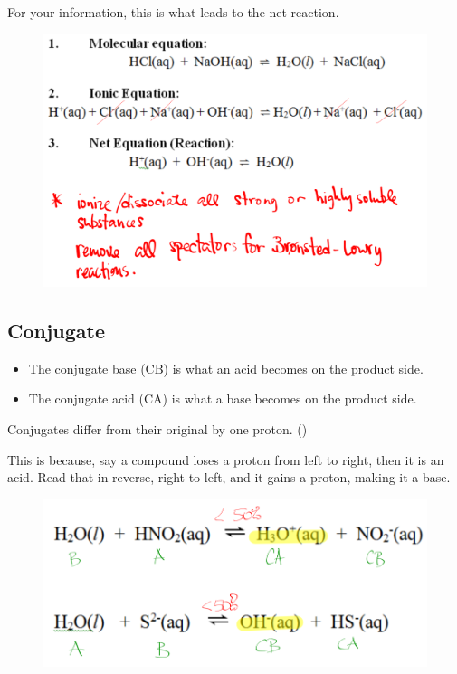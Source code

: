 \documentclass[a4paper,12pt]{article}
\begin{document}
For your information, this is what leads to the net reaction.
\begin{figure}[H]
    \includegraphics[width=\textwidth]{net}
\end{figure}

\pagebreak

\subsection{Conjugate}
\begin{itemize}
    \item{The conjugate base (CB) is what an acid becomes on the product side.}
    \item{The conjugate acid (CA) is what a base becomes on the product side.}
\end{itemize}

Conjugates differ from their original by one proton. ()

This is because, say a compound loses a proton from left to right, then it is an acid. Read that in reverse, right to left, and it gains a proton, making it a base.
\begin{figure}[H]
    \includegraphics[width=\textwidth]{conjugate}
\end{figure}
\end{document}
